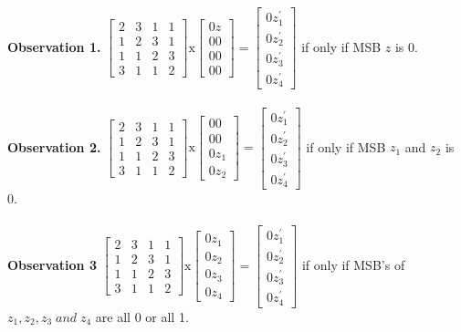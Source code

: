 \begin{frame}
    \textbf{Observation 1.} 
\begin{math}
\begin{bmatrix}
2&3&1&1\\
1&2&3&1\\
1&1&2&3\\
3&1&1&2
\end{bmatrix}
\text{x}
\begin{bmatrix}
0z \\
00 \\
00 \\
00 
\end{bmatrix} = 
\begin{bmatrix}
0z^{'}_{1} \\
0z^{'}_{2} \\
0z^{'}_{3} \\
0z^{'}_{4} 
\end{bmatrix}
\end{math} if only if MSB $z$ is 0. \\ \\
\textbf{Observation 2.} 
\begin{math}
\begin{bmatrix}
2&3&1&1\\
1&2&3&1\\
1&1&2&3\\
3&1&1&2
\end{bmatrix}
\text{x}
\begin{bmatrix}
00 \\
00 \\
0z_{1} \\
0z_{2} 
\end{bmatrix} = 
\begin{bmatrix}
0z^{'}_{1} \\
0z^{'}_{2} \\
0z^{'}_{3} \\
0z^{'}_{4} 
\end{bmatrix}
\end{math} if only if MSB $z_{1}$ and $z_{2}$ is 0. \\ \\
\textbf{Observation 3}
\begin{math}
\begin{bmatrix}
2&3&1&1\\
1&2&3&1\\
1&1&2&3\\
3&1&1&2
\end{bmatrix}
\text{x}
\begin{bmatrix}
0z_{1} \\
0z_{2} \\
0z_{3} \\
0z_{4} 
\end{bmatrix} = 
\begin{bmatrix}
0z^{'}_{1} \\
0z^{'}_{2} \\
0z^{'}_{3} \\
0z^{'}_{4} 
\end{bmatrix}
\end{math}
 if only if MSB's of $z_{1},
z_{2} ,
z_{3} \;and\;
z_{4} $ are all 0 or all 1.\\
\end{frame}
